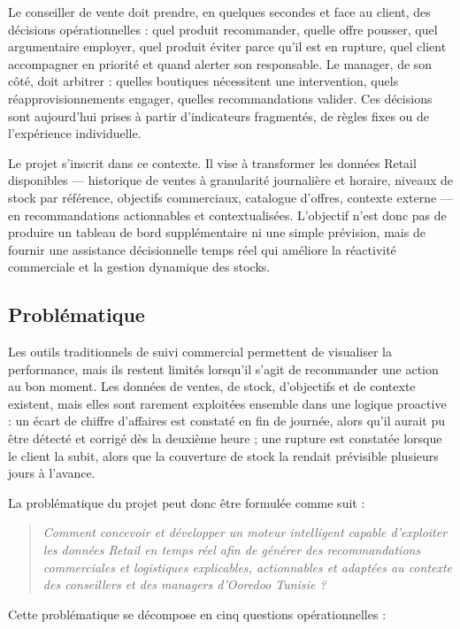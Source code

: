 Le conseiller de vente doit prendre, en quelques secondes et face au client, des décisions opérationnelles : quel produit recommander, quelle offre pousser, quel argumentaire employer, quel produit éviter parce qu'il est en rupture, quel client accompagner en priorité et quand alerter son responsable. Le manager, de son côté, doit arbitrer : quelles boutiques nécessitent une intervention, quels réapprovisionnements engager, quelles recommandations valider. Ces décisions sont aujourd'hui prises à partir d'indicateurs fragmentés, de règles fixes ou de l'expérience individuelle.

Le projet s'inscrit dans ce contexte. Il vise à transformer les données Retail disponibles — historique de ventes à granularité journalière et horaire, niveaux de stock par référence, objectifs commerciaux, catalogue d'offres, contexte externe — en recommandations actionnables et contextualisées. L'objectif n'est donc pas de produire un tableau de bord supplémentaire ni une simple prévision, mais de fournir une assistance décisionnelle temps réel qui améliore la réactivité commerciale et la gestion dynamique des stocks.

\subsection{Problématique}

Les outils traditionnels de suivi commercial permettent de visualiser la performance, mais ils restent limités lorsqu'il s'agit de recommander une action au bon moment. Les données de ventes, de stock, d'objectifs et de contexte existent, mais elles sont rarement exploitées ensemble dans une logique proactive : un écart de chiffre d'affaires est constaté en fin de journée, alors qu'il aurait pu être détecté et corrigé dès la deuxième heure ; une rupture est constatée lorsque le client la subit, alors que la couverture de stock la rendait prévisible plusieurs jours à l'avance.

La problématique du projet peut donc être formulée comme suit :

\begin{quote}
\textit{Comment concevoir et développer un moteur intelligent capable d'exploiter les données Retail en temps réel afin de générer des recommandations commerciales et logistiques explicables, actionnables et adaptées au contexte des conseillers et des managers d'Ooredoo Tunisie ?}
\end{quote}

Cette problématique se décompose en cinq questions opérationnelles :

